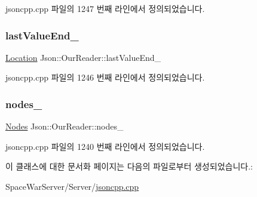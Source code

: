 jsoncpp.\+cpp 파일의 1247 번째 라인에서 정의되었습니다.

\mbox{\label{class_json_1_1_our_reader_a101eadc45e01c60628b53f0db3d13482}} 
\subsubsection{\texorpdfstring{last\+Value\+End\+\_\+}{lastValueEnd\_}}
{\footnotesize\ttfamily \hyperlink{class_json_1_1_our_reader_a1bdc7bbc52ba87cae6b19746f2ee0189}{Location} Json\+::\+Our\+Reader\+::last\+Value\+End\+\_\+\hspace{0.3cm}{\ttfamily [private]}}



jsoncpp.\+cpp 파일의 1246 번째 라인에서 정의되었습니다.

\mbox{\label{class_json_1_1_our_reader_a19cc4e8c5d17ee6822f752e9a36f4ce3}} 
\subsubsection{\texorpdfstring{nodes\+\_\+}{nodes\_}}
{\footnotesize\ttfamily \hyperlink{class_json_1_1_our_reader_a8480a5ef159cee3a090f96358414d8d3}{Nodes} Json\+::\+Our\+Reader\+::nodes\+\_\+\hspace{0.3cm}{\ttfamily [private]}}



jsoncpp.\+cpp 파일의 1240 번째 라인에서 정의되었습니다.



이 클래스에 대한 문서화 페이지는 다음의 파일로부터 생성되었습니다.\+:\begin{DoxyCompactItemize}
\item 
Space\+War\+Server/\+Server/\hyperlink{jsoncpp_8cpp}{jsoncpp.\+cpp}\end{DoxyCompactItemize}
